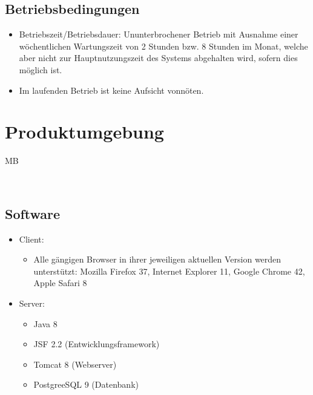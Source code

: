 \documentclass[a4paper]{scrreprt}
\begin{document}
    
	\section{Betriebsbedingungen}
	       \begin{itemize}
		       	\item Betriebszeit/Betriebsdauer: Ununterbrochener Betrieb mit Ausnahme einer wöchentlichen Wartungszeit von 2 Stunden bzw. 8 Stunden im Monat, welche aber nicht zur Hauptnutzungszeit des Systems abgehalten wird, sofern dies möglich ist.
		       	\item  Im laufenden Betrieb ist keine Aufsicht vonnöten.
	       \end{itemize}
	
			
 
\chapter{Produktumgebung}
	\begin{tiny}
		MB
	\end{tiny}\\
	
	\section{Software}
        \begin{itemize}
      		\item \gls{Client}:
	      		\begin{itemize}
	      			\item Alle gängigen Browser in ihrer jeweiligen aktuellen Version  werden unterstützt: Mozilla Firefox 37, Internet Explorer 11, Google Chrome 42, Apple Safari 8
	      		\end{itemize}
          	\item \gls{Server}:
	            \begin{itemize}
	            	\item Java 8
	            	\item \gls{JSF} 2.2 (Entwicklungsframework)
	            	\item \gls{Tomcat} 8 (Webserver)
	            	\item \gls{PostgreeSQL} 9 (Datenbank)
	            \end{itemize}
        \end{itemize}
        
\end{document}
